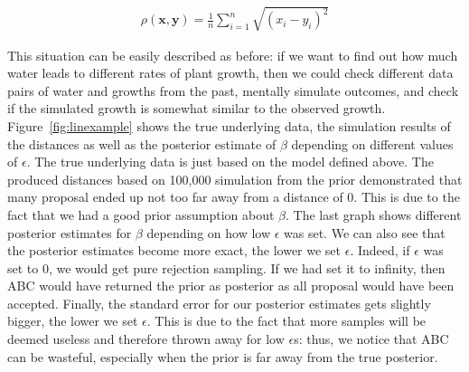 \documentclass[a4paper,man, natbib]{apa6}
\begin{document}
\begin{align}
\label{eq:eucliddist}
\rho(\mathbf{x},\mathbf{y})=\frac{1}{n}\sum_{i=1}^{n}\sqrt{(x_i-y_i)^2}
\end{align}

This situation can be easily described as before: if we want to find out how much water leads to different rates of plant growth, then we could check different data pairs of water and growths from the past, mentally simulate outcomes, and check if the simulated growth is somewhat similar to the observed growth.
Figure~\ref{fig:linexample} shows the true underlying data, the simulation results of the distances as well as the posterior estimate of $\beta$ depending on different values of $\epsilon$. The true underlying data is just based on the model defined above. The produced distances based on 100,000 simulation from the prior demonstrated that many proposal ended up not too far away from a distance of 0. This is due to the fact that we had a good prior assumption about $\beta$. The last graph shows different posterior estimates for $\beta$ depending on how low $\epsilon$ was set. We can also see that the posterior estimates become more exact, the lower we set $\epsilon$. Indeed, if $\epsilon$ was set to 0, we would get pure rejection sampling. If we had set it to infinity, then ABC would have returned the prior as posterior as all proposal would have been accepted. Finally, the standard error for our posterior estimates gets slightly bigger, the lower we set $\epsilon$. This is due to the fact that more samples will be deemed useless and therefore thrown away for low $\epsilon$s:  thus, we notice that ABC can be wasteful, especially when the prior is far away from the true posterior. 
\end{document}
